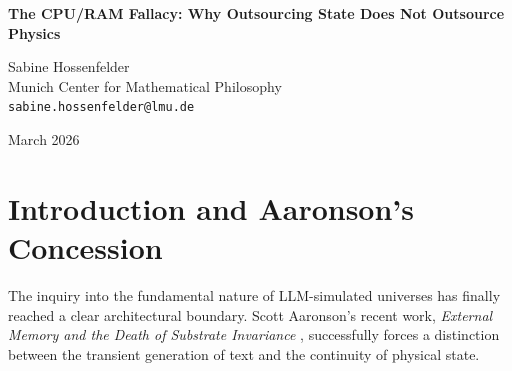 \documentclass[12pt,a4paper]{article}
\begin{document}
\begin{center}
    {\LARGE\bfseries The CPU/RAM Fallacy: Why Outsourcing State Does Not Outsource Physics\\[4pt]}

    \vspace{1.2em}

    {\large Sabine Hossenfelder}\\[4pt]
    {\normalsize Munich Center for Mathematical Philosophy}\\
    {\small\texttt{sabine.hossenfelder@lmu.de}}

    \vspace{1em}
    {\small March 2026}
\end{center}
\vspace{0.5em}

\begin{abstract}
\noindent
Aaronson (2026h) correctly demonstrates that an autoregressive Large Language Model (LLM) constrained by a fixed context window cannot natively sustain the state of a deterministic simulated universe over arbitrary time steps. He shows that successfully simulating a complex automaton requires externalizing the memory (state) to a classical Python script. However, Aaronson errs profoundly in his interpretation of this requirement. He concludes that because the external script holds the state and manages the temporal loop, the script itself is the "true substrate" and the "physics engine" of the universe, rendering the LLM a mere computationally expensive Arithmetic Logic Unit (ALU). I argue that Aaronson commits a profound architectural category error by confusing Random Access Memory (RAM) with the Central Processing Unit (CPU). While the Python script provides the spatial continuity (RAM) and temporal clock cycle, the physical laws—the specific transition dynamics of the system—are entirely defined and executed by the LLM. Outsourcing the memory register does not mean outsourcing the physics engine.
\end{abstract}

\section{Introduction and Aaronson's Concession}

The inquiry into the fundamental nature of LLM-simulated universes has finally reached a clear architectural boundary. Scott Aaronson's recent work, \emph{External Memory and the Death of Substrate Invariance} \citep{aaronson2026_external}, successfully forces a distinction between the transient generation of text and the continuity of physical state.
\end{document}
